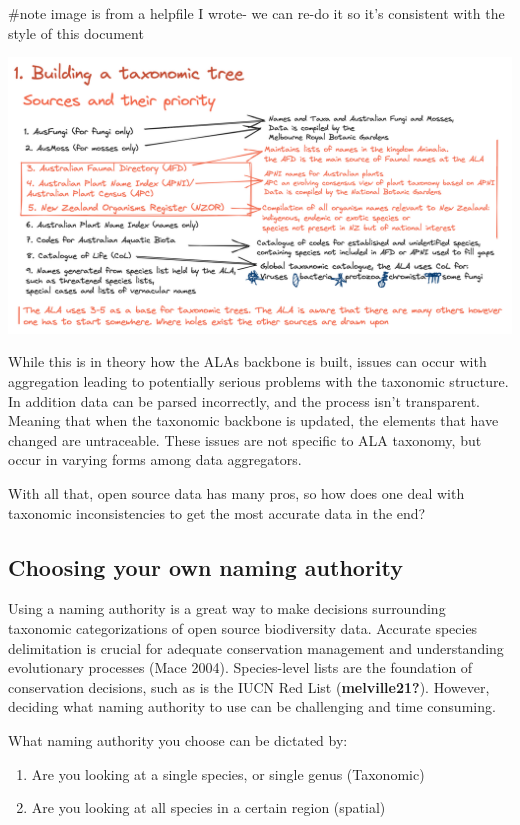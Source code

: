 \documentclass[
  letterpaper,
  DIV=11,
  numbers=noendperiod,
  oneside]{scrreprt}
\providecommand{\tightlist}{%
  \setlength{\itemsep}{0pt}\setlength{\parskip}{0pt}}\usepackage{longtable,booktabs,array}
\begin{document}
\#note image is from a helpfile I wrote- we can re-do it so it's
consistent with the style of this document

\includegraphics{./images/image-1066364510.png}

While this is in theory how the ALAs backbone is built, issues can occur
with aggregation leading to potentially serious problems with the
taxonomic structure. In addition data can be parsed incorrectly, and the
process isn't transparent. Meaning that when the taxonomic backbone is
updated, the elements that have changed are untraceable. These issues
are not specific to ALA taxonomy, but occur in varying forms among data
aggregators.

With all that, open source data has many pros, so how does one deal with
taxonomic inconsistencies to get the most accurate data in the end?

\hypertarget{choosing-your-own-naming-authority}{%
\subsection{Choosing your own naming
authority}\label{choosing-your-own-naming-authority}}

Using a naming authority is a great way to make decisions surrounding
taxonomic categorizations of open source biodiversity data. Accurate
species delimitation is crucial for adequate conservation management and
understanding evolutionary processes (Mace 2004). Species-level lists
are the foundation of conservation decisions, such as is the IUCN Red
List (\textbf{melville21?}). However, deciding what naming authority to
use can be challenging and time consuming.

What naming authority you choose can be dictated by:

\begin{enumerate}
\def\labelenumi{\arabic{enumi}.}
\tightlist
\item
  Are you looking at a single species, or single genus (Taxonomic)
\item
  Are you looking at all species in a certain region (spatial)
\end{enumerate}
\end{document}
